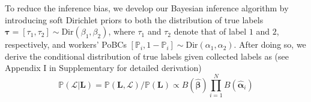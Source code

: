 To reduce the inference bias, we develop our Bayesian inference algorithm by introducing soft Dirichlet priors to both the distribution of true labels $\bm{\tau}=[\tau_1,\tau_2]\sim \textrm{Dir}(\beta_{1},\beta_{2})$, where $\tau_1$ and $\tau_2$ denote that of label $1$ and $2$, respectively,  and workers' PoBCs  $[\mathbb{P}_{i}, 1-\mathbb{P}_i]\sim \textrm{Dir}(\alpha_{1},\alpha_{2})$. After doing so, we derive the conditional distribution of true labels given collected labels as (see Appendix I in Supplementary for detailed derivation)
%
\begin{equation}
\label{PostDist}
\mathbb{P}(\mathcal{L}|\bm{L})=\mathbb{P}(\bm{L},\mathcal{L})/\mathbb{P}(\bm{L})\propto B(\hat{\bm{\beta}}){\prod}_{i=1}^{N}B(\hat{\bm{\alpha}}_{i}) 
\end{equation}

